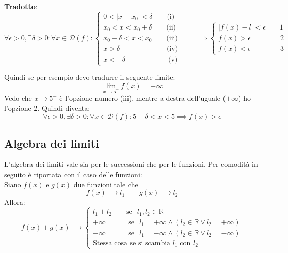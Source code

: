 \textbf{Tradotto}:
\begin{equation*}
    \forall \epsilon >0, \exists \delta > 0: \forall x \in \mathcal{D}(f) :
    \begin{cases*}
        0 < |x-x_0| < \delta \qquad \text{(i)}\\
        x_0 < x < x_0 + \delta \qquad \text{(ii)}\\
        x_0 - \delta < x < x_0 \qquad \text{(iii)}\\
        x > \delta \qquad \qquad\qquad\;\; \text{(iv)}\\
        x < - \delta \qquad \qquad\qquad \text{(v)}
    \end{cases*}
    \qquad
    \implies 
    \begin{cases*}
        |f(x) - l| < \epsilon \qquad 1\\
        f(x) > \epsilon \qquad\qquad\, 2\\
        f(x) < \epsilon \qquad\qquad\, 3
    \end{cases*}
\end{equation*}

Quindi se per esempio devo tradurre il seguente limite:
\begin{equation*}
	\lim_{x \to 5^-} f(x) = +\infty
\end{equation*}
Vedo che $x \to 5^-$ è l'opzione numero (iii), mentre a destra dell'uguale ($+\infty$) ho l'opzione 2. Quindi diventa:
\begin{equation*}
	\forall \epsilon > 0, \exists \delta > 0 : \forall x \in \mathcal{D}(f): 5 - \delta < x < 5 \implies f(x) > \epsilon
\end{equation*}

\subsection{Algebra dei limiti}
L'algebra dei limiti vale sia per le successioni che per le funzioni. Per comodità in seguito è riportata con il caso delle funzioni:\\
Siano $f(x)$ e $g(x)$ due funzioni tale che
\begin{equation*}
    f(x) \xrightarrow{\qquad} l_1 \qquad g(x) \xrightarrow{\qquad} l_2
\end{equation*}
Allora:
\begin{equation*}
    f(x)+g(x) \xrightarrow{\qquad}
    \begin{cases*}
        l_1 + l_2 \qquad \text{se}\;\;\, l_1,l_2 \in \mathbb{R}\\
        +\infty \quad\, \qquad \text{se}\;\;\, l_1 = +\infty \land (l_2 \in \mathbb{R} \lor l_2 = +\infty)\\
        -\infty \quad\, \qquad \text{se}\;\;\, l_1 = -\infty \land (l_2 \in \mathbb{R} \lor l_2 = -\infty)\\
        \text{Stessa cosa se si scambia $l_1$ con $l_2$}
    \end{cases*}
\end{equation*}

